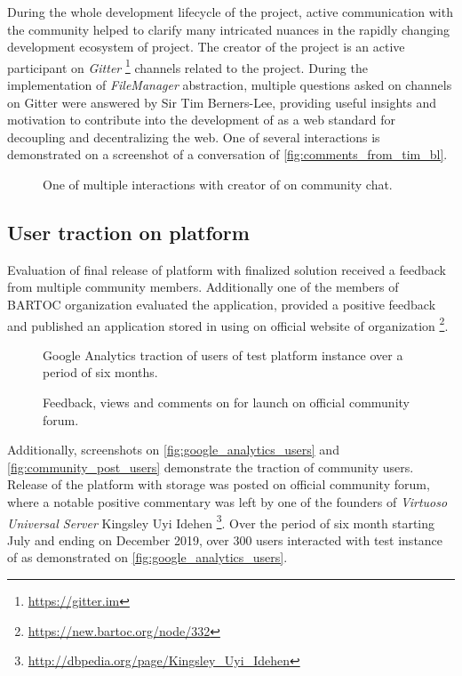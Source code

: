During the whole development lifecycle of the \lpas{} project, active communication with the community helped to clarify many intricated nuances in the rapidly changing development ecosystem of \solid{} project. The creator of the \solid{} project is an active participant on \textit{Gitter} \footnote{\url{https://gitter.im}} channels related to the project. During the implementation of \textit{FileManager} abstraction, multiple questions asked on \solid{} channels on Gitter were answered by Sir Tim Berners-Lee, providing useful insights and motivation to contribute into the development of \solid{} as a web standard for decoupling and decentralizing the web. One of several interactions is demonstrated on a screenshot of a conversation of \autoref{fig:comments_from_tim_bl}.

\begin{figure}[h]
\centering
{}
\caption{One of multiple interactions with creator of \solid{} on \solid{} community chat.}
\label{fig:comments_from_tim_bl}
\end{figure}

\subsection{User traction on \lpa{} platform}

Evaluation of final release of \lpa{} platform with finalized \lpas{} solution received a feedback from multiple \solid{} community members. Additionally one of the members of \gls{BARTOC} organization evaluated the application, provided a positive feedback and published an application stored in \solid{} using \lpas{} on official website of organization \footnote{\url{https://new.bartoc.org/node/332}}. 

\begin{figure}[hbt]
  \caption{Google Analytics traction of users of test \lpa{} platform instance over a period of six months.}
  \label{fig:google_analytics_users}
\endminipage\hfill
{}
  \caption{Feedback, views and comments on for \lpa{} launch on official \solid{} community forum.}
  \label{fig:community_post_users}
\endminipage\hfill
\end{figure}

Additionally, screenshots on \autoref{fig:google_analytics_users} and \autoref{fig:community_post_users} demonstrate the traction of \solid{} community users. Release of the \lpa{} platform with \lpas{} storage was posted on official \solid{} community forum, where a notable positive commentary was left by one of the founders of \textit{Virtuoso Universal Server} Kingsley Uyi Idehen \footnote{\url{http://dbpedia.org/page/Kingsley_Uyi_Idehen}}. Over the period of six month starting July and ending on December 2019, over 300 users interacted with test instance of \lpa{} as demonstrated on \autoref{fig:google_analytics_users}.